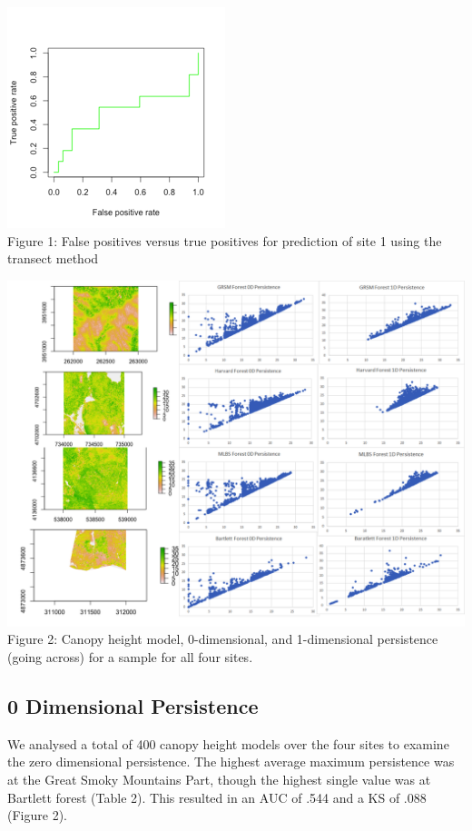 \documentclass[10pt]{article}
\begin{document}
\includegraphics[scale = .8]{AUCTransects}\\
Figure 1: False positives versus true positives for prediction of site 1 using the transect method

\noindent \includegraphics[scale = .55]{summarydata}
Figure 2: Canopy height model, 0-dimensional, and 1-dimensional persistence (going across) for a sample for all four sites.

\subsection*{0 Dimensional Persistence}

We analysed a total of 400 canopy height models over the four sites to examine the zero dimensional persistence. The highest average maximum persistence was at the Great Smoky Mountains Part, though the highest single value was at Bartlett forest (Table 2). This resulted in an AUC of .544 and a KS of .088 (Figure 2).\\
\end{document}
